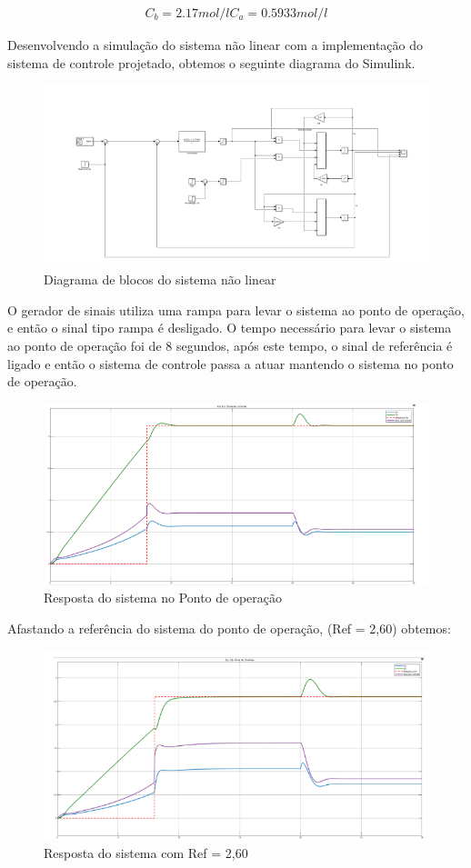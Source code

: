 \documentclass[a4paper,12pt]{article}
\begin{document}
\begin{align}
C_b = 2.17 mol/l
C_a = 0.5933 mol /l
\end{align}


Desenvolvendo a simulação do sistema não linear com a implementação do sistema de controle projetado, obtemos o seguinte diagrama do Simulink.

\begin{figure}[H]
    \centering
    \includegraphics[width=0.8\linewidth]{image8.png}
    \caption{Diagrama de blocos do sistema não linear}
    
\end{figure}

O gerador de sinais utiliza uma rampa para levar o sistema ao ponto de operação, e então o sinal tipo rampa é desligado. O tempo necessário para levar o sistema ao ponto de operação foi de 8 segundos, após este tempo, o sinal de referência é ligado e então o sistema de controle passa a atuar mantendo o sistema no ponto de operação.

\begin{figure}[H]
    \centering
    \includegraphics[width=0.8\linewidth]{image9.png}
    \caption{Resposta do sistema no Ponto de operação}
    
\end{figure}

Afastando a referência do sistema do ponto de operação, (Ref = 2,60) obtemos:

\begin{figure}[H]
    \centering
    \includegraphics[width=0.8\linewidth]{image10.png}
    \caption{Resposta do sistema com Ref = 2,60}
    
\end{figure}
\end{document}
